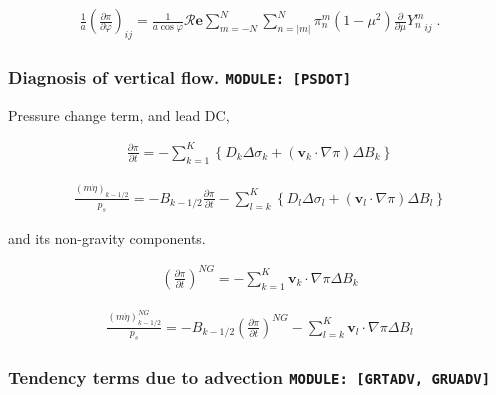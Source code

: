 \begin{eqnarray}
   \frac{1}{a}
   \left( \frac{\partial \pi}{\partial \varphi} \right)_{ij}
     =  
   \frac{1}{a \cos \varphi}
       {\mathcal R}{\mathbf{e}} \sum_{m=-N}^{N} \sum_{n=|m|}^{N}
       \pi_n^m
       ( 1-\mu^{2} ) \frac{\partial }{\partial \mu} {Y_n^m}_{ij}  \; .
\end{eqnarray}

\hypertarget{diagnosis-of-vertical-flow.-module-psdot}{%
\subsubsection{\texorpdfstring{Diagnosis of vertical flow.
\texttt{MODULE:\ {[}PSDOT{]}}}{Diagnosis of vertical flow. MODULE: {[}PSDOT{]}}}\label{diagnosis-of-vertical-flow.-module-psdot}}

Pressure change term, and lead DC,

\begin{eqnarray}
  \frac{\partial \pi}{\partial t}
   = - \sum_{k=1}^{K} \left\{ D_k \Delta\sigma_k + ({\mathbf{v}}_k \cdot \nabla \pi)\Delta B_k \right\}
\end{eqnarray}

\begin{eqnarray}
  \frac{(m\dot{\eta})_{k-1/2}}{p_s}
   = - B_{k-1/2} \frac{\partial \pi}{\partial t}
    - \sum_{l=k}^{K}\left\{ D_l \Delta\sigma_l + ({\mathbf{v}}_l \cdot \nabla \pi)\Delta B_l \right\}
\end{eqnarray}

and its non-gravity components.

\begin{eqnarray}
  \left( \frac{\partial \pi}{\partial t} \right)^{NG}
   =   - \sum_{k=1}^{K} {\mathbf{v}}_{k} \cdot \nabla \pi  
       \Delta B_{k}
\end{eqnarray}

\begin{eqnarray}
  \frac{(m\dot{\eta})^{NG}_{k-1/2}}{p_s}
   = - B_{k-1/2} \left( \frac{\partial \pi}{\partial t} \right)^{NG}
    - \sum_{l=k}^{K} {\mathbf{v}}_{l} \cdot \nabla \pi
       \Delta B_{l}
\end{eqnarray}

\hypertarget{tendency-terms-due-to-advection-module-grtadv-gruadv}{%
\subsubsection{\texorpdfstring{Tendency terms due to advection
\texttt{MODULE:\ {[}GRTADV,\ GRUADV{]}}}{Tendency terms due to advection MODULE: {[}GRTADV, GRUADV{]}}}\label{tendency-terms-due-to-advection-module-grtadv-gruadv}}

